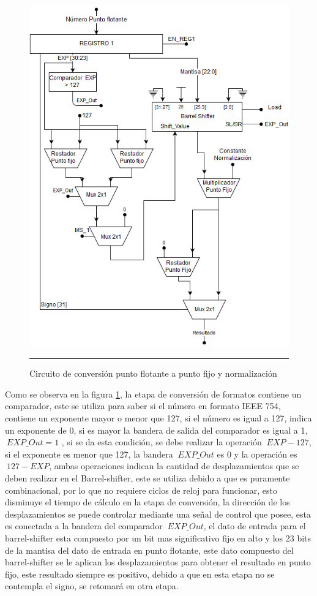   
  \begin{figure}[H]
  \centering
    \includegraphics[scale=0.07]{./NORMALIZADOR.png}
    \rule{35em}{0.5pt}
  \caption[Circuito de conversión punto flotante a punto fijo y normalización]{Circuito de conversión punto flotante a punto fijo y normalización  }
  \label{fig:NORM}
\end{figure} 

Como se observa en la figura \ref{fig:NORM}, la etapa de conversión de formatos contiene un comparador, este se utiliza para saber si el número en formato IEEE 754, contiene un exponente mayor o menor que 127, si el número es igual a 127, indica un exponente de 0, si es mayor la bandera de salida del comparador es igual a 1, $\ EXP\_Out = 1$ , si se da esta condición, se debe realizar la operación $\ EXP - 127$, si el exponente es menor que 127, la bandera $\ EXP\_Out$  es 0 y la operación es $\ 127 - EXP$, ambas operaciones indican la cantidad de desplazamientos que se deben realizar en el Barrel-shifter, este se utiliza debido a que es puramente combinacional, por lo que no requiere ciclos de reloj para funcionar, esto disminuye el tiempo de cálculo en la etapa de conversión, la dirección de los desplazamientos se puede controlar mediante una señal de control que posee, esta es conectada a la bandera del comparador  $\ EXP\_Out $, el dato de entrada para el barrel-shifter esta compuesto por un bit mas significativo fijo en alto y los 23 bits de la mantisa del dato de entrada en punto flotante, este dato compuesto del barrel-shifter se le aplican los desplazamientos para obtener el resultado en punto fijo, este resultado siempre es positivo, debido a que en esta etapa no se contempla el signo, se retomará en otra etapa.    

